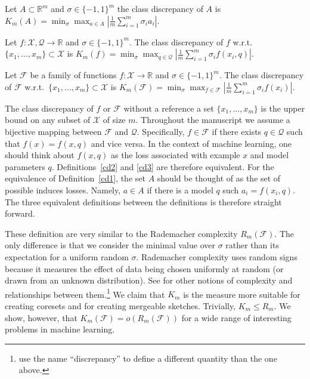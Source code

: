 \documentclass[anon,12pt]{colt2019} %
\newcommand{\R}{\mathbb{R}}
\newcommand{\F}{\mathcal{F}}
\newcommand{\X}{\mathcal{X}}
\newcommand{\Q}{\mathcal{Q}}
\begin{document}
\begin{definition} \label{cd1}
Let $A \subset \R^m$ and $\sigma \in \{-1,1\}^m$ the class discrepancy of $A$ is 
$
K_m(A)  = \min_\sigma \max_{a\in A} \left| \frac{1}{m} \sum_{i=1}^{m}  \sigma_i  a_i\right| 
$.
\end{definition}
%
\begin{definition}\label{cd2}
Let $f:\X,\Q\rightarrow\R$ and $\sigma \in \{-1,1\}^m$. 
The class discrepancy of $f$ w.r.t.\ $\{x_1,\ldots,x_m\} \subset \X$ is 
$
K_m(f) =  \min_{\sigma} \max_{q \in \Q}  \left|\frac{1}{m} \sum_{i=1}^{m}\sigma_i f(x_i,q)\right|
$.
\end{definition}
%
\begin{definition}\label{cd3}
Let $\F$ be a family of functions $f:\X\rightarrow\R$ and $\sigma \in \{-1,1\}^m$. 
The class discrepancy of $\F$ w.r.t.\ $\{x_1,\ldots,x_m\} \subset \X$ is 
$
K_m(\F) =  \min_{\sigma} \max_{f \in \F}  \left| \frac{1}{m} \sum_{i=1}^{m}\sigma_i f(x_i)\right|
$.
\end{definition}
The class discrepancy of $f$ or $\F$ without a reference a set $\{x_1,\ldots,x_m\}$ is the upper bound on any subset of $\X$ of size $m$.
Throughout the manuscript we assume a bijective mapping between $\F$ and $\Q$. 
Specifically, $f \in \F$ if there exists $q \in \Q$ such that $f(x) = f(x,q)$ and vice versa. 
In the context of machine learning, one should think about $f(x,q)$ as the loss associated with example $x$ and model parameters $q$.
Definitions~\ref{cd2} and \ref{cd3} are therefore equivalent. 
For the equivalence of Definition~\ref{cd1}, the set $A$ should be thought of as the set of possible induces losses. 
Namely, $a\in A$ if there is a model $q$ such $a_i = f(x_i,q)$.
The three equivalent definitions between the definitions is therefore straight forward. 


These definition are very similar to the Rademacher complexity $R_m(\F)$.
The only difference is that we consider the minimal value over $\sigma$ rather than its expectation for a uniform random $\sigma$.
Rademacher complexity uses random signs because it measures the effect of data being chosen uniformly at random (or drawn from an unknown distribution). See \cite{Bartlett:2003:RGC:944919.944944} for other notions of complexity and relationships between them.\footnote{\cite{Bartlett:2003:RGC:944919.944944} use the name ``discrepancy'' to define a different quantity than the one above.}
 We claim that $K_m$ is the measure more suitable for creating coresets and for creating mergeable sketches.
Trivially,  $K_m \le R_m$. We show, however, that $K_m(\F) = o(R_m(\F))$ for a wide range of interesting problems in machine learning.
\end{document}
